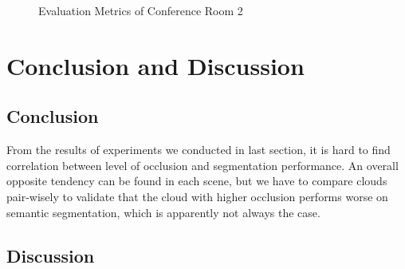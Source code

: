 \documentclass[11pt, a4paper,oneside,chapterprefix=false]{scrbook}
\begin{document}
\begin{figure}[H]
    \centering
    \caption{Evaluation Metrics of Conference Room 2}
    \label{fig:evaluation metrics of conference room 2}
\end{figure}


\chapter{Conclusion and Discussion} \label{chp:conclusion}

\section{Conclusion}

From the results of experiments we conducted in last section, it is hard to find correlation between level of occlusion and segmentation performance. An overall opposite tendency can be found in each scene, but we have to compare clouds pair-wisely to validate that the cloud with higher occlusion performs worse on semantic segmentation, which is apparently not always the case.

\section{Discussion}
\end{document}
